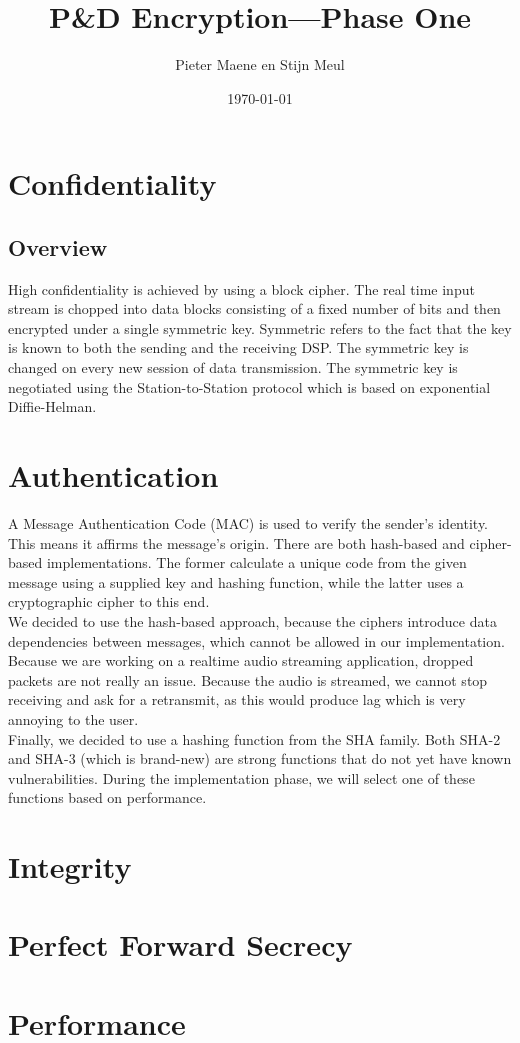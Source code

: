 \documentclass[a4paper]{article}
\title{P\&D Encryption---Phase One}
\author{Pieter Maene en Stijn Meul}
\date{\today}
\begin{document}
\maketitle

\section{Confidentiality}

\subsection{Overview}
High confidentiality is achieved by using a block cipher. The real time input stream is chopped into data blocks consisting of a fixed number of bits and then encrypted under a single symmetric key. Symmetric refers to the fact that the key is known to both the sending and the receiving DSP. The symmetric key is changed on every new session of data transmission. The symmetric key is negotiated using the Station-to-Station protocol which is based on exponential Diffie-Helman.



\section{Authentication}

A Message Authentication Code (MAC) is used to verify the sender's identity. This means it affirms the message's origin. There are both hash-based and cipher-based implementations. The former calculate a unique code from the given message using a supplied key and hashing function, while the latter uses a cryptographic cipher to this end.\\

We decided to use the hash-based approach, because the ciphers introduce data dependencies between messages, which cannot be allowed in our implementation. Because we are working on a realtime audio streaming application, dropped packets are not really an issue. Because the audio is streamed, we cannot stop receiving and ask for a retransmit, as this would produce lag which is very annoying to the user.\\

Finally, we decided to use a hashing function from the SHA family. Both SHA-2 and SHA-3 (which is brand-new) are strong functions that do not yet have known vulnerabilities. During the implementation phase, we will select one of these functions based on performance.

\section{Integrity}

\section{Perfect Forward Secrecy}

\section{Performance}
\end{document}
